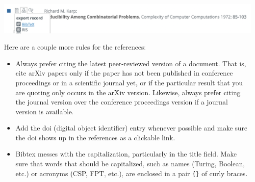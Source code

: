 \begin{center}
\includegraphics[width=0.8\linewidth]{Sources/dblp.png}
\end{center}

Here are a couple more rules for the references:
\begin{itemize}
\item
Always prefer citing the latest peer-reviewed version of a document. That is, cite arXiv papers only if the paper has not been published in conference proceedings or in a scientific journal yet, or if the particular result that you are quoting only occurs in the arXiv version. Likewise, always prefer citing the journal version over the conference proceedings version if a journal version is available.
\item
Add the doi (digital object identifier) entry whenever possible and make sure the doi shows up in the references as a clickable link.
\item
Bibtex messes with the capitalization, particularly in the title field. Make sure that words that should be capitalized, such as names (Turing, Boolean, etc.) or acronyms (CSP, FPT, etc.), are enclosed in a pair \texttt{\{\}} of curly braces.
\end{itemize}
